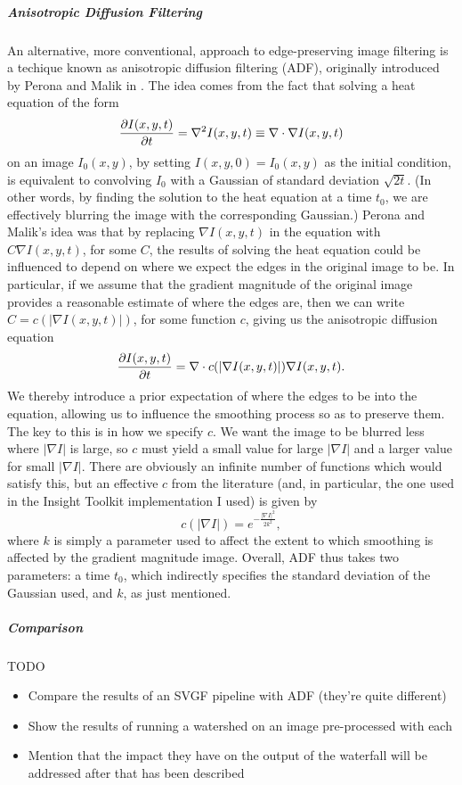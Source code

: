 \subparagraph{Anisotropic Diffusion Filtering}

An alternative, more conventional, approach to edge-preserving image filtering is a techique known as anisotropic diffusion filtering (ADF), originally introduced by Perona and Malik in \cite{perona90}. The idea comes from the fact that solving a heat equation of the form
%
\[
\frac{\partial I(x,y,t)}{\partial t} = \nabla^2 I(x,y,t) \equiv \nabla \cdot \nabla I(x,y,t)
\]
%
on an image $I_0(x,y)$, by setting $I(x,y,0) = I_0(x,y)$ as the initial condition, is equivalent to convolving $I_0$ with a Gaussian of standard deviation $\sqrt{2t}$. (In other words, by finding the solution to the heat equation at a time $t_0$, we are effectively blurring the image with the corresponding Gaussian.) Perona and Malik's idea was that by replacing $\nabla I(x,y,t)$ in the equation with $C \nabla I(x,y,t)$, for some $C$, the results of solving the heat equation could be influenced to depend on where we expect the edges in the original image to be. In particular, if we assume that the gradient magnitude of the original image provides a reasonable estimate of where the edges are, then we can write $C = c(|\nabla I(x,y,t)|)$, for some function $c$, giving us the anisotropic diffusion equation
%
\[
\frac{\partial I(x,y,t)}{\partial t} = \nabla \cdot c(|\nabla I(x,y,t)|) \nabla I(x,y,t).
\]
%
We thereby introduce a prior expectation of where the edges to be into the equation, allowing us to influence the smoothing process so as to preserve them. The key to this is in how we specify $c$. We want the image to be blurred less where $|\nabla I|$ is large, so $c$ must yield a small value for large $|\nabla I|$ and a larger value for small $|\nabla I|$. There are obviously an infinite number of functions which would satisfy this, but an effective $c$ from the literature (and, in particular, the one used in the Insight Toolkit \cite{ITK} implementation I used) is given by
%
\[
c(|\nabla I|) = e^{-\frac{|\nabla I|^2}{2k^2}},
\]
%
where $k$ is simply a parameter used to affect the extent to which smoothing is affected by the gradient magnitude image. Overall, ADF thus takes two parameters: a time $t_0$, which indirectly specifies the standard deviation of the Gaussian used, and $k$, as just mentioned.

\subparagraph{Comparison}

TODO

\begin{itemize}
\item Compare the results of an SVGF pipeline with ADF (they're quite different)
\item Show the results of running a watershed on an image pre-processed with each
\item Mention that the impact they have on the output of the waterfall will be addressed after that has been described
\end{itemize}

